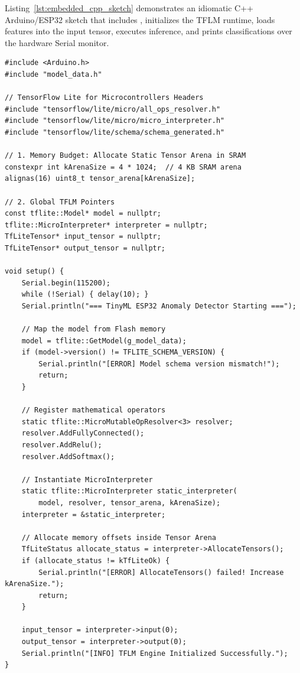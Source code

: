 Listing~\ref{lst:embedded_cpp_sketch} demonstrates an idiomatic C++ Arduino/ESP32 sketch that includes , initializes the TFLM runtime, loads features into the input tensor, executes inference, and prints classifications over the hardware Serial monitor.

\begin{lstlisting}[style=pythonstyle, caption={Idiomatic C++ Arduino/ESP32 sketch executing inference with TFLM.}, label={lst:embedded_cpp_sketch}]
#include <Arduino.h>
#include "model_data.h"

// TensorFlow Lite for Microcontrollers Headers
#include "tensorflow/lite/micro/all_ops_resolver.h"
#include "tensorflow/lite/micro/micro_interpreter.h"
#include "tensorflow/lite/schema/schema_generated.h"

// 1. Memory Budget: Allocate Static Tensor Arena in SRAM
constexpr int kArenaSize = 4 * 1024;  // 4 KB SRAM arena
alignas(16) uint8_t tensor_arena[kArenaSize];

// 2. Global TFLM Pointers
const tflite::Model* model = nullptr;
tflite::MicroInterpreter* interpreter = nullptr;
TfLiteTensor* input_tensor = nullptr;
TfLiteTensor* output_tensor = nullptr;

void setup() {
    Serial.begin(115200);
    while (!Serial) { delay(10); }
    Serial.println("=== TinyML ESP32 Anomaly Detector Starting ===");

    // Map the model from Flash memory
    model = tflite::GetModel(g_model_data);
    if (model->version() != TFLITE_SCHEMA_VERSION) {
        Serial.println("[ERROR] Model schema version mismatch!");
        return;
    }

    // Register mathematical operators
    static tflite::MicroMutableOpResolver<3> resolver;
    resolver.AddFullyConnected();
    resolver.AddRelu();
    resolver.AddSoftmax();

    // Instantiate MicroInterpreter
    static tflite::MicroInterpreter static_interpreter(
        model, resolver, tensor_arena, kArenaSize);
    interpreter = &static_interpreter;

    // Allocate memory offsets inside Tensor Arena
    TfLiteStatus allocate_status = interpreter->AllocateTensors();
    if (allocate_status != kTfLiteOk) {
        Serial.println("[ERROR] AllocateTensors() failed! Increase kArenaSize.");
        return;
    }

    input_tensor = interpreter->input(0);
    output_tensor = interpreter->output(0);
    Serial.println("[INFO] TFLM Engine Initialized Successfully.");
}


\end{lstlisting}
